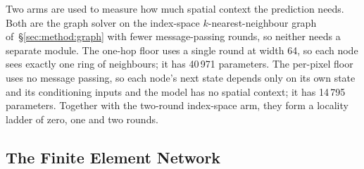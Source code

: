 %

Two arms are used to measure how much spatial context the prediction
needs. Both are
the graph solver on the index-space $k$-nearest-neighbour graph
of~\S\ref{sec:method:graph} with fewer message-passing rounds, so neither
needs a separate module. The one-hop floor uses a single round at width 64,
so each node sees exactly one ring of neighbours; it has 40\,971 parameters.
The per-pixel floor uses no message passing, so each node's next state
depends only on its own state and its conditioning inputs and the model
has no spatial context; it has 14\,795 parameters. Together with the
two-round index-space arm, they form a locality ladder of zero, one and two
rounds.

\subsection{The Finite Element Network}
\label{sec:method:family:fen}

